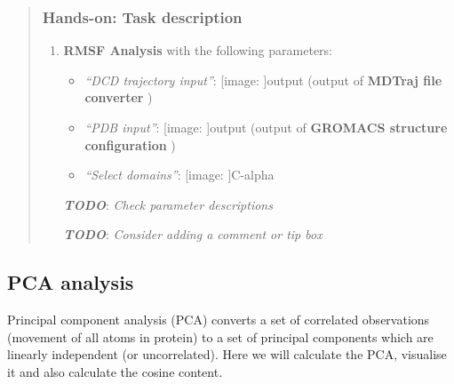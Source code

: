 \documentclass[twocolumn]{bmcart}%
\def\texttt{[image: ]}
\providecommand{\tightlist}{%
  \setlength{\itemsep}{0pt}\setlength{\parskip}{0pt}}
\begin{document}
\begin{quote}
\hypertarget{hands-on-task-description-12}{%
\subsubsection{Hands-on: Task
description}\label{hands-on-task-description-12}}

\begin{enumerate}
\def\labelenumi{\arabic{enumi}.}
\tightlist
\item
  \textbf{RMSF Analysis} with the following parameters:

  \begin{itemize}
  \tightlist
  \item
    \emph{``DCD trajectory input''}: \texttt{output} (output of
    \textbf{MDTraj file converter} )
  \item
    \emph{``PDB input''}: \texttt{output} (output of \textbf{GROMACS
    structure configuration} )
  \item
    \emph{``Select domains''}: \texttt{C-alpha}
  \end{itemize}

  \textbf{\emph{TODO}}: \emph{Check parameter descriptions}

  \textbf{\emph{TODO}}: \emph{Consider adding a comment or tip box}
\end{enumerate}


\end{quote}


\hypertarget{pca-analysis}{%
\subsection{PCA analysis}\label{pca-analysis}}

Principal component analysis (PCA) converts a set of correlated
observations (movement of all atoms in protein) to a set of principal
components which are linearly independent (or uncorrelated). Here we
will calculate the PCA, visualise it and also calculate the cosine
content.
\end{document}
